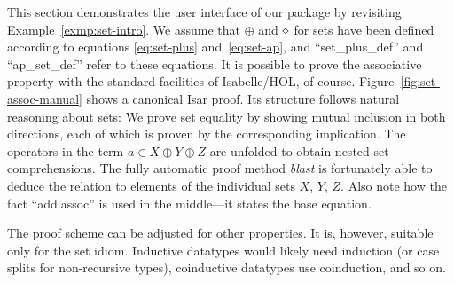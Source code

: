 This section demonstrates the user interface of our package by revisiting
Example~\ref{exmp:set-intro}.
We assume that $\oplus$ and $\diamond$ for sets have been defined according to
equations \eqref{eq:set-plus} and~\eqref{eq:set-ap}, and ``set\_plus\_def'' and
``ap\_set\_def'' refer to these equations.
It is possible to prove the associative property with the standard facilities
of Isabelle/HOL, of course.
Figure~\ref{fig:set-assoc-manual} shows a canonical Isar proof.
Its structure follows natural reasoning about sets:
We prove set equality by showing mutual inclusion in both directions, each of
which is proven by the corresponding implication.
The operators in the term $a \in X \oplus Y \oplus Z$ are unfolded to obtain
nested set comprehensions.
The fully automatic proof method \emph{blast} is fortunately able to deduce
the relation to elements of the individual sets $X$, $Y$, $Z$.
Also note how the fact ``add.assoc'' is used in the middle---it states the base
equation.

The proof scheme can be adjusted for other properties.
It is, however, suitable only for the set idiom.
Inductive datatypes would likely need induction (or case splits for
non-recursive types), coinductive datatypes use coinduction, and so on.

